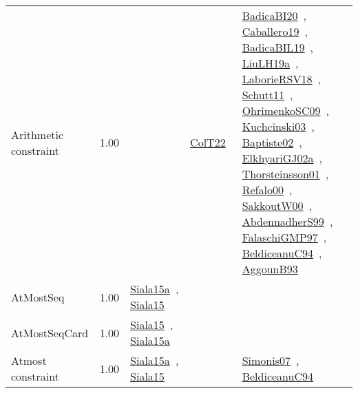 {\begin{longtable}{p{3cm}r>{\raggedright\arraybackslash}p{6cm}>{\raggedright\arraybackslash}p{6cm}>{\raggedright\arraybackslash}p{8cm}}
\index{Arithmetic constraint}\index{Constraints!Arithmetic constraint}Arithmetic constraint &  1.00 &  & \href{../works/ColT22.pdf}{ColT22}~\cite{ColT22} & \href{../works/BadicaBI20.pdf}{BadicaBI20}~\cite{BadicaBI20}, \href{../works/Caballero19.pdf}{Caballero19}~\cite{Caballero19}, \href{../works/BadicaBIL19.pdf}{BadicaBIL19}~\cite{BadicaBIL19}, \href{../works/LiuLH19a.pdf}{LiuLH19a}~\cite{LiuLH19a}, \href{../works/LaborieRSV18.pdf}{LaborieRSV18}~\cite{LaborieRSV18}, \href{../works/Schutt11.pdf}{Schutt11}~\cite{Schutt11}, \href{../works/OhrimenkoSC09.pdf}{OhrimenkoSC09}~\cite{OhrimenkoSC09}, \href{../works/Kuchcinski03.pdf}{Kuchcinski03}~\cite{Kuchcinski03}, \href{../works/Baptiste02.pdf}{Baptiste02}~\cite{Baptiste02}, \href{../works/ElkhyariGJ02a.pdf}{ElkhyariGJ02a}~\cite{ElkhyariGJ02a}, \href{../works/Thorsteinsson01.pdf}{Thorsteinsson01}~\cite{Thorsteinsson01}, \href{../works/Refalo00.pdf}{Refalo00}~\cite{Refalo00}, \href{../works/SakkoutW00.pdf}{SakkoutW00}~\cite{SakkoutW00}, \href{../works/AbdennadherS99.pdf}{AbdennadherS99}~\cite{AbdennadherS99}, \href{../works/FalaschiGMP97.pdf}{FalaschiGMP97}~\cite{FalaschiGMP97}, \href{../works/BeldiceanuC94.pdf}{BeldiceanuC94}~\cite{BeldiceanuC94}, \href{../works/AggounB93.pdf}{AggounB93}~\cite{AggounB93}\\
\index{AtMostSeq}\index{Constraints!AtMostSeq}AtMostSeq &  1.00 & \href{../works/Siala15a.pdf}{Siala15a}~\cite{Siala15a}, \href{../works/Siala15.pdf}{Siala15}~\cite{Siala15} &  & \\
\index{AtMostSeqCard}\index{Constraints!AtMostSeqCard}AtMostSeqCard &  1.00 & \href{../works/Siala15.pdf}{Siala15}~\cite{Siala15}, \href{../works/Siala15a.pdf}{Siala15a}~\cite{Siala15a} &  & \\
\index{Atmost constraint}\index{Constraints!Atmost constraint}Atmost constraint &  1.00 & \href{../works/Siala15a.pdf}{Siala15a}~\cite{Siala15a}, \href{../works/Siala15.pdf}{Siala15}~\cite{Siala15} &  & \href{../works/Simonis07.pdf}{Simonis07}~\cite{Simonis07}, \href{../works/BeldiceanuC94.pdf}{BeldiceanuC94}~\cite{BeldiceanuC94}\\

\end{longtable}}
